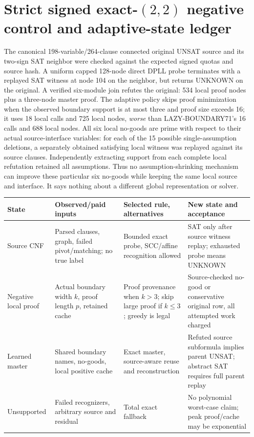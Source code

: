 \documentclass[11pt]{article}
\begin{document}
\section{Strict signed exact-$(2,2)$ negative control and adaptive-state ledger}
The canonical 198-variable/264-clause connected original UNSAT source and its two-sign SAT neighbor were checked against the expected signed quotas and source hash. A uniform capped 128-node direct DPLL probe terminates with a replayed SAT witness at node 104 on the neighbor, but returns UNKNOWN on the original. A verified six-module join refutes the original: 534 local proof nodes plus a three-node master proof. The adaptive policy skips proof minimization when the observed boundary support is at most three and proof size exceeds 16; it uses 18 local calls and 725 local nodes, \emph{worse} than LAZY-BOUNDARY71's 16 calls and 688 local nodes.
All six local no-goods are prime with respect to their actual source-interface variables: for each of the 15 possible single-assumption deletions, a separately obtained satisfying local witness was replayed against its source clauses. Independently extracting support from each complete local refutation retained all assumptions. Thus no assumption-shrinking mechanism can improve these particular six no-goods while keeping the same local source and interface. It says nothing about a different global representation or solver.
\begin{center}\small
\begin{tabular}{p{.18\linewidth}p{.25\linewidth}p{.25\linewidth}p{.23\linewidth}}
\toprule
State&Observed/paid inputs&Selected rule, alternatives&New state and acceptance\\\midrule
Source CNF&Parsed clauses, graph, failed pivot/matching; no true label&Bounded exact probe, SCC/affine recognition allowed&SAT only after source witness replay; exhausted probe means UNKNOWN\\
Negative local proof&Actual boundary width $k$, proof length $p$, retained cache&Proof provenance when $k>3$; skip large proof if $k\le3$; greedy is legal&Source-checked no-good or conservative original row, all attempted work charged\\
Learned master&Shared boundary names, no-goods, local positive cache&Exact master, source-aware reuse and reconstruction&Refuted source subformula implies parent UNSAT; abstract SAT requires full parent replay\\
Unsupported&Failed recognizers, arbitrary source and residual&Total exact fallback&No polynomial worst-case claim; peak proof/cache may be exponential\\
\bottomrule
\end{tabular}
\end{center}
\end{document}
